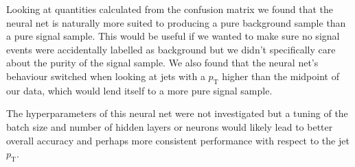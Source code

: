 \documentclass[11pt]{article}
\numberwithin{equation}{section}
\numberwithin{figure}{section}
\numberwithin{table}{section}
\begin{document}
Looking at quantities calculated from the confusion matrix we found that the neural net is naturally more suited to producing a pure background sample than a pure signal sample. This would be useful if we wanted to make sure no signal events were accidentally labelled as background but we didn't specifically care about the purity of the signal sample. We also found that the neural net's behaviour switched when looking at jets with a $p_\mathrm{T}$ higher than the midpoint of our data, which would lend itself to a more pure signal sample. 

The hyperparameters of this neural net were not investigated but a tuning of the batch size and number of hidden layers or neurons would likely lead to better overall accuracy and perhaps more consistent performance with respect to the jet $p_\mathrm{T}$. 

\newpage
\printbibliography
\end{document}
